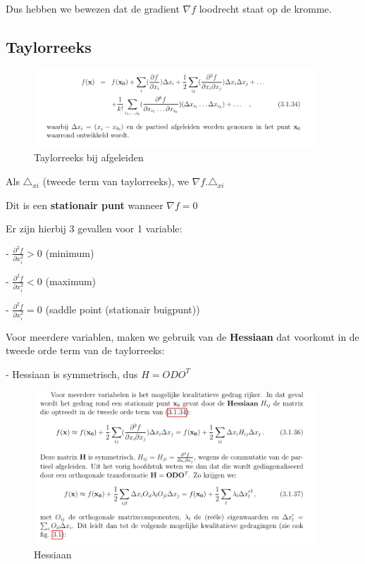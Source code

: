 \documentclass[a4paper]{article}
\begin{document}
Dus hebben we bewezen dat de gradient $\nabla f$ loodrecht staat op de kromme.

\subsection{Taylorreeks}

\begin{figure}[H]
	\begin{center}
		\includegraphics[width=0.95\textwidth]{./images/taylor_afgeleid.png}
	\end{center}
	\caption{Taylorreeks bij afgeleiden}
	\label{}
\end{figure}

Als $\triangle_{xi}$ (tweede term van taylorreeks), we $\nabla f . \triangle_{xi}$

Dit is een \textbf{stationair punt} wanneer $\nabla f = 0$

Er zijn hierbij 3 gevallen voor 1 variable:

- $\frac{\partial^2 f}{\partial x_i^2} > 0$ (minimum)

- $\frac{\partial^2 f}{\partial x_i^2} < 0$ (maximum)

- $\frac{\partial^2 f}{\partial x_i^2} = 0$ (saddle point (stationair buigpunt))

Voor meerdere variablen, maken we gebruik van de \textbf{Hessiaan} dat voorkomt in de tweede orde term van de taylorreeks:

- Hessiaan is symmetrisch, dus $H = O D O^T$

\begin{figure}[H]
	\begin{center}
		\includegraphics[width=0.95\textwidth]{./images/hessiaan.png}
	\end{center}
	\caption{Hessiaan}
	\label{}
\end{figure}
\end{document}
